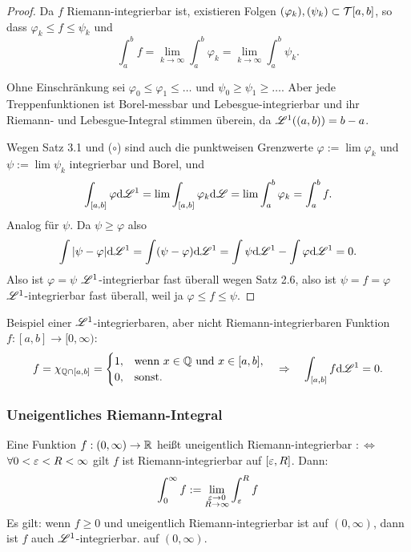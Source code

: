\documentclass[
 a4paper,
 12pt,
 parskip=half
 ]{scrartcl}
\theoremstyle{plain}
\theoremstyle{definition}
\numberwithin{equation}{section}
\begin{document}
\begin{proof}
 Da $f$ Riemann-integrierbar ist, existieren Folgen $(\varphi_k), (\psi_k) \subset \mathcal{T}[a,b]$, so dass $\varphi_k \le f \le \psi_k$ und
 \[ \int_a^b f = \lim_{k\to\infty} \int_a^b \varphi_k = \lim_{k\to\infty} \int_a^b \psi_k. \tag{$\circ$} \]

 Ohne Einschränkung sei $\varphi_0 \le \varphi_1 \le \ldots$ und $\psi_0 \ge \psi_1 \ge \ldots$. Aber jede Treppenfunktionen ist Borel-messbar und Lebesgue-integrierbar und ihr Riemann- und Lebesgue-Integral stimmen überein, da $\mathscr{L}^1( (a,b) ) = b - a$.

 Wegen Satz 3.1 und ($\circ$) sind auch die punktweisen Grenzwerte $\varphi := \lim \varphi_k$ und $\psi := \lim \psi_k$ integrierbar und Borel, und
 \[ \int_{[a,b]} \varphi \mathrm{d} \mathscr{L}^1 = \lim \int_{[a,b]} \varphi_k \mathrm{d} \mathscr{L} = \lim \int_a^b \varphi_k = \int_a^b f. \]
 Analog für $\psi$. Da $\psi \ge \varphi$ also
 \[ \int | \psi - \varphi | \mathrm{d} \mathscr{L}^1 = \int (\psi - \varphi) \mathrm{d} \mathscr{L}^1 = \int \psi \mathrm{d} \mathscr{L}^1 - \int \varphi \mathrm{d} \mathscr{L}^1 = 0. \]
 Also ist $\varphi = \psi$ $\mathscr{L}^1$-integrierbar fast überall wegen Satz 2.6, also ist $\psi = f = \varphi$ $\mathscr{L}^1$-integrierbar fast überall, weil ja $\varphi \le f \le \psi$.
\end{proof}

Beispiel einer $\mathscr{L}^1$-integrierbaren, aber nicht Riemann-integrierbaren Funktion $f:[a,b] \to [0,\infty)$:
\[ f = \chi_{\mathbb{Q} \cap [a,b]} = \begin{cases} 1, &\text{wenn } x \in \mathbb{Q} \text{ und } x \in [a,b], \\
                                 0, &\text{sonst.}
                                \end{cases}
   \quad \Rightarrow \quad \int_{[a,b]} f \mathrm{d} \mathscr{L}^1 = 0. \]
   
\subsubsection*{Uneigentliches Riemann-Integral}
Eine Funktion $f:(0,\infty) \to \mathbb{R}$ heißt uneigentlich Riemann-integrierbar $:\Leftrightarrow$ $\forall 0 < \varepsilon < R < \infty$ gilt $f$ ist Riemann-integrierbar auf $[\varepsilon,R]$. Dann:
\[ \int_0^\infty f := \lim_{\substack{\varepsilon \to 0 \\ R \to \infty}} \int_\varepsilon^R f \]
Es gilt: wenn $f \ge 0$ und uneigentlich Riemann-integrierbar ist auf $(0,\infty)$, dann ist $f$ auch $\mathscr{L}^1$-integrierbar. auf $(0,\infty)$.
\end{document}
